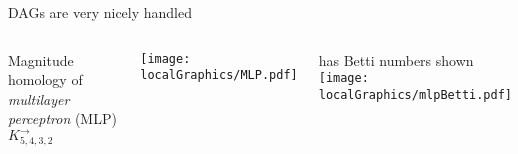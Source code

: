 \documentclass[usenames,dvipsnames,10pt,aspectratio=169]{beamer}
\begin{document}
\begin{frame}{DAGs are very nicely handled}

\begin{columns}
Magnitude homology of \emph{multilayer perceptron} (MLP) $K^\rightarrow_{5,4,3,2}$

\texttt{[image: localGraphics/MLP.pdf]}

has Betti numbers shown
\centering
\texttt{[image: localGraphics/mlpBetti.pdf]}
\end{columns}
\end{frame}

\end{document}
